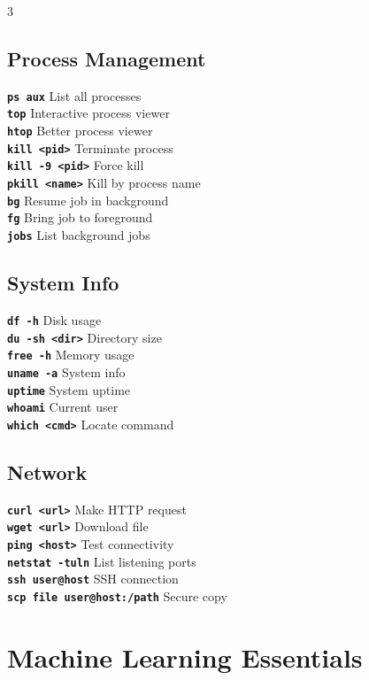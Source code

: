 \documentclass[7pt,landscape]{extarticle}
\newcommand{\cmd}[1]{\textcolor{csPrimary}{\texttt{\textbf{\fontsize{6pt}{7pt}\selectfont#1}}}}
\begin{document}
\begin{multicols*}{3}
\subsection*{Process Management}
\cmd{ps aux} \hfill List all processes \\
\cmd{top} \hfill Interactive process viewer \\
\cmd{htop} \hfill Better process viewer \\
\cmd{kill <pid>} \hfill Terminate process \\
\cmd{kill -9 <pid>} \hfill Force kill \\
\cmd{pkill <name>} \hfill Kill by process name \\
\cmd{bg} \hfill Resume job in background \\
\cmd{fg} \hfill Bring job to foreground \\
\cmd{jobs} \hfill List background jobs

\subsection*{System Info}
\cmd{df -h} \hfill Disk usage \\
\cmd{du -sh <dir>} \hfill Directory size \\
\cmd{free -h} \hfill Memory usage \\
\cmd{uname -a} \hfill System info \\
\cmd{uptime} \hfill System uptime \\
\cmd{whoami} \hfill Current user \\
\cmd{which <cmd>} \hfill Locate command

\subsection*{Network}
\cmd{curl <url>} \hfill Make HTTP request \\
\cmd{wget <url>} \hfill Download file \\
\cmd{ping <host>} \hfill Test connectivity \\
\cmd{netstat -tuln} \hfill List listening ports \\
\cmd{ssh user@host} \hfill SSH connection \\
\cmd{scp file user@host:/path} \hfill Secure copy

\section*{Machine Learning Essentials}


\end{multicols*}
\end{document}
